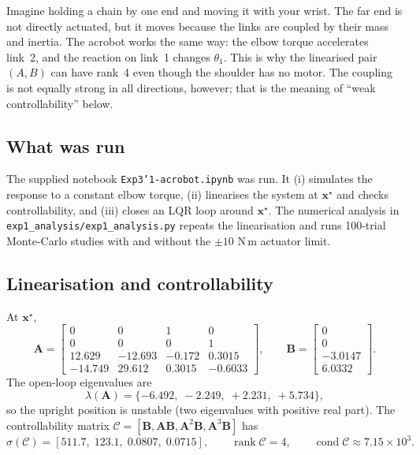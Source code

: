 \documentclass[11pt]{article}
\newcommand{\x}{\mathbf{x}}
\newcommand{\A}{\mathbf{A}}
\newcommand{\B}{\mathbf{B}}
\newcommand{\C}{\mathcal{C}}
\begin{document}
\begin{intuition}[breakable=false,title={Why can a one-motor two-link robot still be controllable?}]
Imagine holding a chain by one end and moving it with your wrist.  The far
end is not directly actuated, but it moves because the links are coupled by
their mass and inertia.  The acrobot works the same way: the elbow torque
accelerates link~2, and the reaction on link~1 changes $\theta_1$.  This is
why the linearised pair $(A,B)$ can have rank~4 even though the shoulder has
no motor.  The coupling is not equally strong in all directions, however;
that is the meaning of ``weak controllability'' below.
\end{intuition}

\subsection{What was run}

The supplied notebook \texttt{Exp3'1-acrobot.ipynb} was run.  It
(i) simulates the response to a constant elbow torque, (ii) linearises the
system at $\x^\star$ and checks controllability, and (iii) closes an LQR loop
around $\x^\star$.  The numerical analysis in
\texttt{exp1\_analysis/exp1\_analysis.py} repeats the linearisation and runs
100-trial Monte-Carlo studies with and without the $\pm10$ N\,m actuator
limit.

\subsection{Linearisation and controllability}

At $\x^\star$,
\begin{equation}
\A=\begin{bmatrix}
0 & 0 & 1 & 0\\
0 & 0 & 0 & 1\\
12.629 & -12.693 & -0.172 & 0.3015\\
-14.749 & 29.612 & 0.3015 & -0.6033
\end{bmatrix},
\qquad
\B=\begin{bmatrix}0\\0\\-3.0147\\6.0332\end{bmatrix}.
\end{equation}
The open-loop eigenvalues are
\begin{equation}
\lambda(\A)=\{-6.492,\;-2.249,\;+2.231,\;+5.734\},
\end{equation}
so the upright position is unstable (two eigenvalues with positive real part).
The controllability matrix $\C=[\B,\A\B,\A^2\B,\A^3\B]$ has
\begin{equation}
\sigma(\C)=[511.7,\;123.1,\;0.0807,\;0.0715],
\qquad
\operatorname{rank}\C=4,
\qquad
\operatorname{cond}\C\approx 7.15\times10^3 .
\end{equation}
\end{document}
